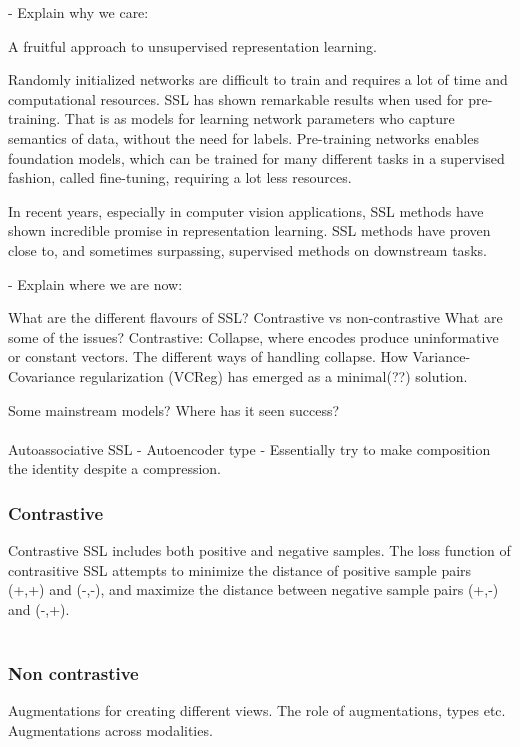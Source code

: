 \documentclass[../../thesis.tex]{subfiles}
\begin{document}
- Explain why we care:

A fruitful approach to unsupervised representation learning.

Randomly initialized networks are difficult to train and requires a lot of time and computational resources. SSL has shown remarkable results when used for pre-training. That is as models for learning network parameters who capture semantics of data, without the need for labels. Pre-training networks enables foundation models, which can be trained for many different tasks in a supervised fashion, called fine-tuning, requiring a lot less resources.


In recent years, especially in computer vision applications, SSL methods have shown incredible promise in representation learning. SSL methods have proven close to, and sometimes surpassing, supervised methods on downstream tasks. 


- Explain where we are now:


What are the different flavours of SSL? Contrastive vs non-contrastive
What are some of the issues? 
Contrastive: Collapse, where encodes produce uninformative or constant vectors. The different ways of handling collapse. How Variance-Covariance regularization (VCReg) \cite{mialon2024variance} has emerged as a minimal(??) solution. 


Some mainstream models? 
Where has it seen success?\\\\


Autoassociative SSL - Autoencoder type - Essentially try to make composition the identity despite a compression. 


\subsubsection{Contrastive}
Contrastive SSL includes both positive and negative samples. The loss function of contrasitive SSL attempts to minimize the distance of positive sample pairs (+,+) and (-,-), and maximize the distance between negative sample pairs (+,-) and (-,+).\\\\

\subsubsection{Non contrastive}

Augmentations for creating different views. The role of augmentations, types etc. Augmentations across modalities. 
\end{document}
